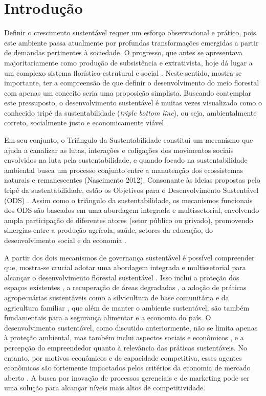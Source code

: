 \section{Introdução}

Definir o crescimento sustentável requer um esforço observacional e prático, pois este ambiente passa atualmente por profundas transformações emergidas a partir de demandas pertinentes à sociedade. O progresso, que antes se apresentava majoritariamente como produção de subsistência e extrativista, hoje dá lugar a um complexo sistema florístico-estrutural e social \cite{Casarejos2018}. Neste sentido, mostra-se importante, ter a compreensão de que definir o desenvolvimento do meio florestal com apenas um conceito seria uma proposição simplista. Buscando contemplar este pressuposto, o desenvolvimento sustentável é muitas vezes visualizado como o conhecido tripé da sustentabilidade (\textit{triple bottom line}), ou seja, ambientalmente correto, socialmente justo e economicamente viável \cite{Nations2015TransformingDevelopment}.

Em seu conjunto, o Triângulo da Sustentabilidade constitui um mecanismo que ajuda a canalizar as lutas, interações e coligações dos movimentos sociais envolvidos na luta pela sustentabilidade, e quando focado na sustentabilidade ambiental busca um processo conjunto entre a manutenção dos ecossistemas naturais e remanescentes (Nascimento 2012). Consonante às ideias propostas pelo tripé da sustentabilidade, estão os Objetivos para o Desenvolvimento Sustentável (ODS) \cite{FAO2014}. Assim como o triângulo da sustentabilidade, os mecanismos funcionais dos ODS são baseados em uma abordagem integrada e multissetorial, envolvendo ampla participação de diferentes atores (setor público ou privado), promovendo sinergias entre a produção agrícola, saúde, setores da educação, do desenvolvimento social e da economia \cite{Kroll2019SustainableSynergies}.

A partir dos dois mecanismos de governança sustentável é possível compreender que, mostra-se crucial adotar uma abordagem integrada e multissetorial para alcançar o desenvolvimento florestal sustentável \cite{Smith2012}. Isso inclui a proteção dos espaços existentes \cite{Billah2022SaltIndicators}, a recuperação de áreas degradadas \cite{Appanah2016ForestForests.}, a adoção de práticas agropecuárias sustentáveis como a silvicultura de base comunitária e da agricultura familiar \cite{Lohmus2016ThePopulations,Bressane2016EnvironmentalSustainability}, que além de manter o ambiente sustentável, são também fundamentais para a segurança alimentar e a economia do país. O desenvolvimento sustentável, como discutido anteriormente, não se limita apenas à proteção ambiental, mas também inclui aspectos sociais e econômicos \cite{Wang2020,Calloway2019EnvironmentalJournal.}, e a percepção do empreendedor quanto à relevância das práticas sustentáveis. No entanto, por motivos econômicos e de capacidade competitiva, esses agentes econômicos são fortemente impactados pelos critérios da economia de mercado aberto \cite{Adzic2008StrategySolutions}. A busca por inovação de processos gerenciais e de marketing pode ser uma solução para alcançar níveis mais altos de competitividade.

